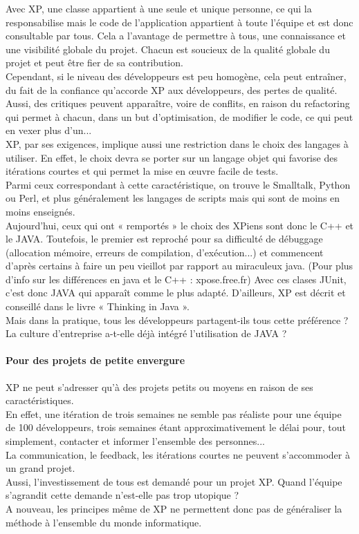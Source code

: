 \documentclass[]{article}
\let\oldparagraph\paragraph
\renewcommand{\paragraph}[1]{\oldparagraph{#1}\mbox{}}
\begin{document}
Avec XP, une classe appartient à une seule et unique personne, ce qui la
responsabilise mais le code de l'application appartient à toute l'équipe
et est donc consultable par tous. Cela a l'avantage de permettre à tous,
une connaissance et une visibilité globale du projet. Chacun est
soucieux de la qualité globale du projet et peut être fier de sa
contribution.~\\
Cependant, si le niveau des développeurs est peu homogène, cela peut
entraîner, du fait de la confiance qu'accorde XP aux développeurs, des
pertes de qualité. Aussi, des critiques peuvent apparaître, voire de
conflits, en raison du refactoring qui permet à chacun, dans un but
d'optimisation, de modifier le code, ce qui peut en vexer plus d'un...\\
XP, par ses exigences, implique aussi une restriction dans le choix des
langages à utiliser. En effet, le choix devra se porter sur un langage
objet qui favorise des itérations courtes et qui permet la mise en œuvre
facile de tests.\\
Parmi ceux correspondant à cette caractéristique, on trouve le
Smalltalk, Python ou Perl, et plus généralement les langages de scripts
mais qui sont de moins en moins enseignés.~\\
Aujourd'hui, ceux qui ont « remportés » le choix des XPiens sont donc le
C++ et le JAVA. Toutefois, le premier est reproché pour sa difficulté de
débuggage (allocation mémoire, erreurs de compilation, d'exécution...)
et commencent d'après certains à faire un peu vieillot par rapport au
miraculeux java. (Pour plus d'info sur les différences en java et le C++
: xpose.free.fr) Avec ces clases JUnit, c'est donc JAVA qui apparaît
comme le plus adapté. D'ailleurs, XP est décrit et conseillé dans le
livre « Thinking in Java ».\\
Mais dans la pratique, tous les développeurs partagent-ils tous cette
préférence ? La culture d'entreprise a-t-elle déjà intégré l'utilisation
de JAVA ?




\hypertarget{pour-des-projets-de-petite-envergure}{%
\paragraph{Pour des projets de petite
envergure}\label{pour-des-projets-de-petite-envergure}}

XP ne peut s'adresser qu'à des projets petits ou moyens en raison de ses
caractéristiques.~\\
En effet, une itération de trois semaines ne semble pas réaliste pour
une équipe de 100 développeurs, trois semaines étant approximativement
le délai pour, tout simplement, contacter et informer l'ensemble des
personnes...~\\
La communication, le feedback, les itérations courtes ne peuvent
s'accommoder à un grand projet.~\\
Aussi, l'investissement de tous est demandé pour un projet XP. Quand
l'équipe s'agrandit cette demande n'est-elle pas trop utopique ?\\
A nouveau, les principes même de XP ne permettent donc pas de
généraliser la méthode à l'ensemble du monde informatique.
\end{document}
